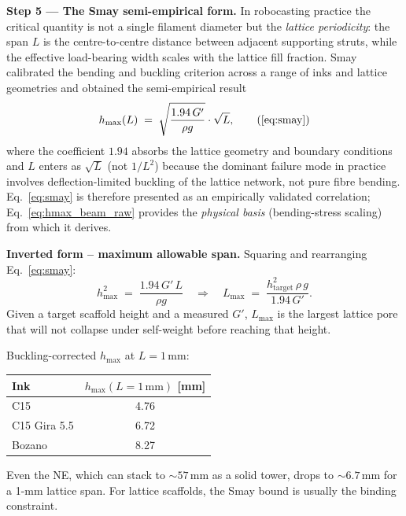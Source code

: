 \documentclass[11pt,a4paper]{article}
\begin{document}
\begin{derivationbox}[title={DERIVATION --- Beam-bending basis of the Smay criterion}]
\medskip\noindent\textbf{Step 5 --- The Smay semi-empirical form.}
In robocasting practice the critical quantity is not a single filament
diameter but the \emph{lattice periodicity}: the span $L$ is the
centre-to-centre distance between adjacent supporting struts, while the
effective load-bearing width scales with the lattice fill fraction.
Smay \citep{HabibKhoda2018} calibrated the bending and buckling
criterion across a range of inks and lattice geometries and obtained
the semi-empirical result
\begin{equation}
h_\mathrm{max}(L) \;=\; \sqrt{\frac{1.94\,G'}{\rho g}}\cdot\sqrt{L},
\tag{\ref{eq:smay}}
\end{equation}
where the coefficient $1.94$ absorbs the lattice geometry and boundary
conditions and $L$ enters as $\sqrt{L}$ (not $1/L^2$) because the
dominant failure mode in practice involves deflection-limited buckling
of the lattice network, not pure fibre bending.
Eq.~\eqref{eq:smay} is therefore presented as an empirically validated
correlation; Eq.~\eqref{eq:hmax_beam_raw} provides the \emph{physical
basis} (bending-stress scaling) from which it derives.

\medskip\noindent\textbf{Inverted form -- maximum allowable span.}
Squaring and rearranging Eq.~\eqref{eq:smay}:
\begin{equation}
h_\mathrm{max}^2 \;=\; \frac{1.94\,G'\,L}{\rho g}
\quad\Rightarrow\quad
L_\mathrm{max}
\;=\; \frac{h_\mathrm{target}^2\,\rho\,g}{1.94\,G'}.
\label{eq:smay_Lmax}
\end{equation}
Given a target scaffold height and a measured $G'$, $L_\mathrm{max}$ is
the largest lattice pore that will not collapse under self-weight before
reaching that height.
\end{derivationbox}

\begin{examplebox}
Buckling-corrected $h_\mathrm{max}$ at $L=1\,\si{\mm}$:

\medskip\centering
\begin{tabular}{lc}
\toprule
Ink & $h_\mathrm{max}(L=1\,\si{\mm})$ [\si{\mm}] \\
\midrule
C15           & 4.76 \\
C15 Gira 5.5  & 6.72 \\
Bozano        & 8.27 \\
\bottomrule
\end{tabular}

\medskip\flushleft
Even the NE, which can stack to $\sim 57\,\si{\mm}$ as a solid tower,
drops to $\sim 6.7\,\si{\mm}$ for a 1-\si{\mm} lattice span. For
lattice scaffolds, the Smay bound is usually the binding constraint.
\end{examplebox}
\end{document}
